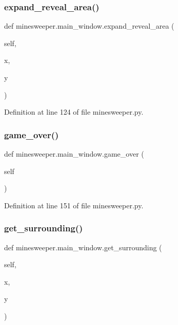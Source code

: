 \subsubsection{\texorpdfstring{expand\_reveal\_area()}{expand\_reveal\_area()}}
{\footnotesize\ttfamily def minesweeper.\+main\+\_\+window.\+expand\+\_\+reveal\+\_\+area (\begin{DoxyParamCaption}\item[{}]{self,  }\item[{}]{x,  }\item[{}]{y }\end{DoxyParamCaption})}



Definition at line 124 of file minesweeper.\+py.

\mbox{\label{classminesweeper_1_1main__window_a1f06ad21fe3e6b7c7e995bb77f22ede9}} 
\subsubsection{\texorpdfstring{game\_over()}{game\_over()}}
{\footnotesize\ttfamily def minesweeper.\+main\+\_\+window.\+game\+\_\+over (\begin{DoxyParamCaption}\item[{}]{self }\end{DoxyParamCaption})}



Definition at line 151 of file minesweeper.\+py.

\mbox{\label{classminesweeper_1_1main__window_a565763aa263b90221a95c8ac31b4da9b}} 
\subsubsection{\texorpdfstring{get\_surrounding()}{get\_surrounding()}}
{\footnotesize\ttfamily def minesweeper.\+main\+\_\+window.\+get\+\_\+surrounding (\begin{DoxyParamCaption}\item[{}]{self,  }\item[{}]{x,  }\item[{}]{y }\end{DoxyParamCaption})}



